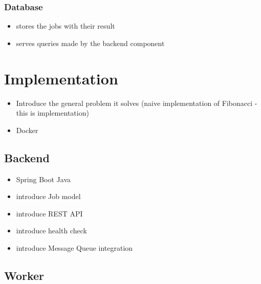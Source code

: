 \subsubsection{Database}

\begin{itemize}
	\item stores the jobs with their result 
	\item serves queries made by the backend component
\end{itemize}

\section{Implementation}

\begin{itemize}
	\item Introduce the general problem it solves (naive implementation of Fibonacci - this is implementation)
	\item Docker
\end{itemize}

\subsection{Backend}

\begin{itemize}
	\item Spring Boot Java
	\item introduce Job model
	\item introduce REST API
	\item introduce health check
	\item introduce Message Queue integration
\end{itemize}

\subsection{Worker}

